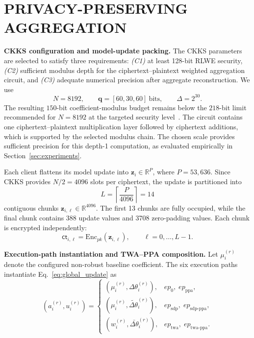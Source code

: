 \documentclass[journal]{IEEEtran}
\begin{document}
\section{PRIVACY-PRESERVING AGGREGATION}\label{sec:ppa_aggregation}

\textbf{CKKS configuration and model-update packing.}\label{sec:param_selection}
The CKKS parameters are selected to satisfy three requirements:
\emph{(C1)} at least 128-bit RLWE security,
\emph{(C2)} sufficient modulus depth for the ciphertext--plaintext weighted
aggregation circuit, and
\emph{(C3)} adequate numerical precision after aggregate reconstruction.
We use
\[
N=8192,
\qquad
\mathbf{q}=[60,30,60]\ \text{bits},
\qquad
\Delta=2^{30}.
\]
The resulting $150$-bit coefficient-modulus budget remains below the
$218$-bit limit recommended for $N=8192$ at the targeted security
level~\cite{albrecht2021he}. The circuit contains one
ciphertext--plaintext multiplication layer followed by ciphertext additions,
which is supported by the selected modulus chain. The chosen scale provides
sufficient precision for this depth-1 computation, as evaluated empirically in
Section~\ref{sec:experiments}.

Each client flattens its model update into
$\mathbf{z}_i\in\mathbb{R}^{P}$, where $P=53{,}636$. Since CKKS provides
$N/2=4096$ slots per ciphertext, the update is partitioned into
\[
L=\left\lceil\frac{P}{4096}\right\rceil=14
\]
contiguous chunks
$\mathbf{z}_{i,\ell}\in\mathbb{R}^{4096}$.
The first 13 chunks are fully occupied, while the final chunk contains
388 update values and 3708 zero-padding values. Each chunk is encrypted
independently:
\[
\mathsf{ct}_{i,\ell}
=
\mathrm{Enc}_{pk}(\mathbf{z}_{i,\ell}),
\qquad
\ell=0,\ldots,L-1.
\]

\textbf{Execution-path instantiation and TWA--PPA composition.}
\label{sec:twa_ppa_integration}
Let $\mu_i^{(r)}$ denote the configured non-robust baseline coefficient.
The six execution paths instantiate Eq.~\eqref{eq:global_update} as
\begin{equation}\label{eq:path_mapping}
(a_i^{(r)},u_i^{(r)})
=
\begin{cases}
(\mu_i^{(r)},\Delta\theta_i^{(r)}),
& ep_0,\;ep_{\mathrm{ppa}},\\
(\mu_i^{(r)},\widetilde{\Delta\theta}_i^{(r)}),
& ep_{\mathrm{sdp}},\;ep_{\mathrm{sdp\text{-}ppa}},\\
(w_i^{(r)},\bar{\Delta\theta}_i^{(r)}),
& ep_{\mathrm{twa}},\;ep_{\mathrm{twa\text{-}ppa}}.
\end{cases}
\end{equation}
\end{document}
